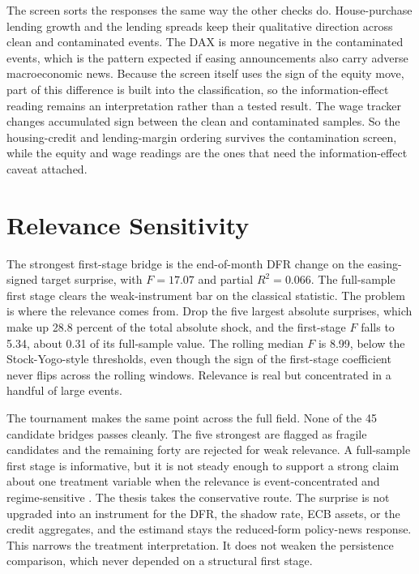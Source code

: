 The screen sorts the responses the same way the other checks do. House-purchase lending growth and the lending spreads keep their qualitative direction across clean and contaminated events. The DAX is more negative in the contaminated events, which is the pattern expected if easing announcements also carry adverse macroeconomic news. Because the screen itself uses the sign of the equity move, part of this difference is built into the classification, so the information-effect reading remains an interpretation rather than a tested result. The wage tracker changes accumulated sign between the clean and contaminated samples. So the housing-credit and lending-margin ordering survives the contamination screen, while the equity and wage readings are the ones that need the information-effect caveat attached.

\section{Relevance Sensitivity}

The strongest first-stage bridge is the end-of-month DFR change on the easing-signed target surprise, with \(F=17.07\) and partial \(R^2=0.066\). The full-sample first stage clears the weak-instrument bar on the classical statistic. The problem is where the relevance comes from. Drop the five largest absolute surprises, which make up 28.8 percent of the total absolute shock, and the first-stage \(F\) falls to 5.34, about 0.31 of its full-sample value. The rolling median \(F\) is 8.99, below the Stock-Yogo-style thresholds, even though the sign of the first-stage coefficient never flips across the rolling windows. Relevance is real but concentrated in a handful of large events.



The tournament makes the same point across the full field. None of the 45 candidate bridges passes cleanly. The five strongest are flagged as fragile candidates and the remaining forty are rejected for weak relevance. A full-sample first stage is informative, but it is not steady enough to support a strong claim about one treatment variable when the relevance is event-concentrated and regime-sensitive \parencite{StockYogo2005}. The thesis takes the conservative route. The surprise is not upgraded into an instrument for the DFR, the shadow rate, ECB assets, or the credit aggregates, and the estimand stays the reduced-form policy-news response. This narrows the treatment interpretation. It does not weaken the persistence comparison, which never depended on a structural first stage.

